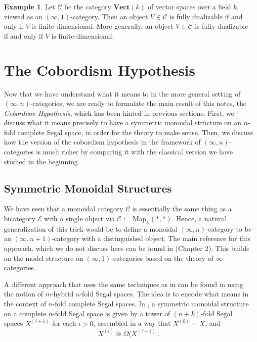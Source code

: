 \documentclass[a4paper,11pt]{article}
\newcommand{\ccal}{\mathcal{C}}
\newcommand{\ecal}{\mathcal{E}}
\theoremstyle{plain}
\theoremstyle{definition}
\newtheorem{ej}[thm]{Example}
\theoremstyle{remark}
\begin{document}
\begin{ej}
Let $\ccal$ be the category $\textbf{Vect}(k)$ of vector spaces over a field $k$, viewed as an $(\infty, 1)$-category. Then an object $V \in \ccal$ is fully dualizable if and only if $V$ is finite-dimensional. More generally, an object $V \in \ccal$ is fully dualizable if and only if $V$ is finite-dimensional. 
\end{ej}

\section{The Cobordism Hypothesis}
\label{section_6}


Now that we have understand what it means to  in the more general setting of $(\infty, n)$-categories, we are ready to formulate the main result of this notes, the \textit{Cobordism Hypothesis}, which has been hinted in previous sections. First, we discuss what it means precisely to have a symmetric monoidal structure on an $n$-fold complete Segal space, in order for the theory to make sense. Then, we discuss how the version of the cobordism hypothesis in the framework of $(\infty, n)$-categories is much richer by comparing it with the classical version we have studied in the beginning. 


\subsection{Symmetric Monoidal Structures}

We have seen that a monoidal category $\ccal$ is essentially the same thing as a bicategory $\ecal$ with a single object via $\ccal := \text{Map}_{\ecal}(*, *)$. Hence, a natural generalization of this trick would be to define a monoidal $(\infty, n)$-category to be an $(\infty, n+1)$-category with a distinguished object. The main reference for this approach, which we do not discuss here can be found in \cite{lurie3} (Chapter 2). This builds on the model structure on $(\infty, 1)$-categories based on the theory of $\infty$-categories. 

A different approach that uses the same techniques as in \cite{lurie3} can be found in \cite{symmetric} using the notion of $m$-hybrid $n$-fold Segal spaces. The idea is to encode what  means in the context of $n$-fold complete Segal spaces. In \cite{symmetric}, a symmetric monoidal structure on a complete $n$-fold Segal space is given by a tower of $(n+k)$-fold Segal spaces $X^{(i+1)}$ for each $i >0$, assembled in a way that $X^{(0)} = X$, and 
$$X^{(i)} \cong \Omega(X^{(i+1)} \, .$$
\end{document}
